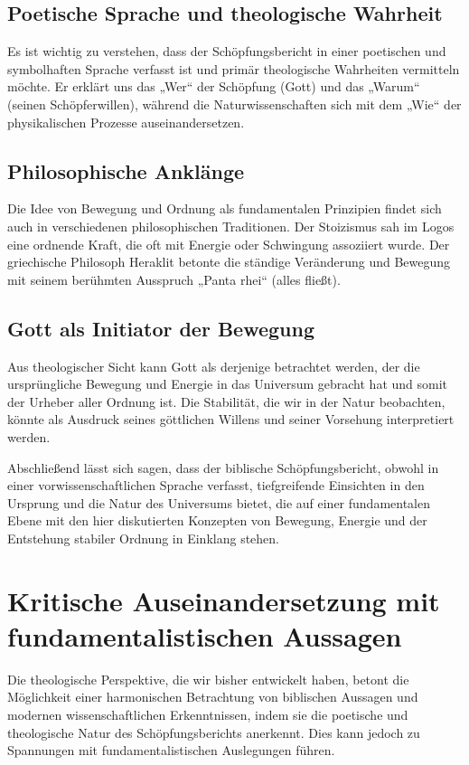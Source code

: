 \documentclass{article}
\begin{document}
	\subsection*{Poetische Sprache und theologische Wahrheit}
	Es ist wichtig zu verstehen, dass der Schöpfungsbericht in einer poetischen und symbolhaften Sprache verfasst ist und primär theologische Wahrheiten vermitteln möchte. Er erklärt uns das „Wer“ der Schöpfung (Gott) und das „Warum“ (seinen Schöpferwillen), während die Naturwissenschaften sich mit dem „Wie“ der physikalischen Prozesse auseinandersetzen.
	
	\subsection*{Philosophische Anklänge}
	Die Idee von Bewegung und Ordnung als fundamentalen Prinzipien findet sich auch in verschiedenen philosophischen Traditionen. Der Stoizismus sah im Logos eine ordnende Kraft, die oft mit Energie oder Schwingung assoziiert wurde. Der griechische Philosoph Heraklit betonte die ständige Veränderung und Bewegung mit seinem berühmten Ausspruch „Panta rhei“ (alles fließt).
	
	\subsection*{Gott als Initiator der Bewegung}
	Aus theologischer Sicht kann Gott als derjenige betrachtet werden, der die ursprüngliche Bewegung und Energie in das Universum gebracht hat und somit der Urheber aller Ordnung ist. Die Stabilität, die wir in der Natur beobachten, könnte als Ausdruck seines göttlichen Willens und seiner Vorsehung interpretiert werden.
	
	Abschließend lässt sich sagen, dass der biblische Schöpfungsbericht, obwohl in einer vorwissenschaftlichen Sprache verfasst, tiefgreifende Einsichten in den Ursprung und die Natur des Universums bietet, die auf einer fundamentalen Ebene mit den hier diskutierten Konzepten von Bewegung, Energie und der Entstehung stabiler Ordnung in Einklang stehen.
\section{Kritische Auseinandersetzung mit fundamentalistischen Aussagen}

Die theologische Perspektive, die wir bisher entwickelt haben, betont die Möglichkeit einer harmonischen Betrachtung von biblischen Aussagen und modernen wissenschaftlichen Erkenntnissen, indem sie die poetische und theologische Natur des Schöpfungsberichts anerkennt. Dies kann jedoch zu Spannungen mit fundamentalistischen Auslegungen führen.
\end{document}

